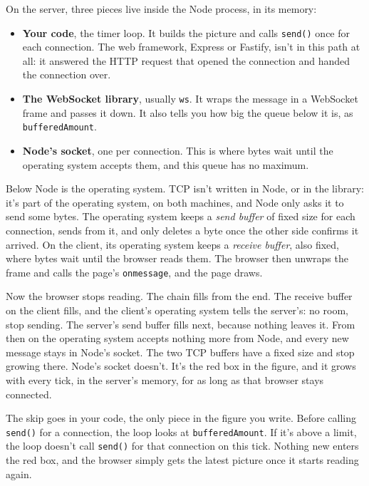 On the server, three pieces live inside the Node process, in its memory:

\begin{itemize}
\item \textbf{Your code}, the timer loop. It builds the picture and calls
  \texttt{send()} once for each connection. The web framework, Express or
  Fastify, isn't in this path at all: it answered the HTTP request that opened
  the connection and handed the connection over.
\item \textbf{The WebSocket library}, usually \texttt{ws}. It wraps the
  message in a WebSocket frame and passes it down. It also tells you how big
  the queue below it is, as \texttt{bufferedAmount}.
\item \textbf{Node's socket}, one per connection. This is where bytes wait
  until the operating system accepts them, and this queue has no maximum.
\end{itemize}

Below Node is the operating system. TCP isn't written in Node, or in the
library: it's part of the operating system, on both machines, and Node only
asks it to send some bytes. The operating system keeps a \emph{send buffer} of
fixed size for each connection, sends from it, and only deletes a byte once the
other side confirms it arrived. On the client, its operating system keeps a
\emph{receive buffer}, also fixed, where bytes wait until the browser reads
them. The browser then unwraps the frame and calls the page's
\texttt{onmessage}, and the page draws.

Now the browser stops reading. The chain fills from the end. The receive
buffer on the client fills, and the client's operating system tells the
server's: no room, stop sending. The server's send buffer fills next, because
nothing leaves it. From then on the operating system accepts nothing more from
Node, and every new message stays in Node's socket. The two TCP buffers have a
fixed size and stop growing there. Node's socket doesn't. It's the red box in
the figure, and it grows with every tick, in the server's memory, for as long as
that browser stays connected.

The skip goes in your code, the only piece in the figure you write. Before
calling \texttt{send()} for a connection, the loop looks at
\texttt{bufferedAmount}. If it's above a limit, the loop doesn't call
\texttt{send()} for that connection on this tick. Nothing new enters the red
box, and the browser simply gets the latest picture once it starts reading
again.

